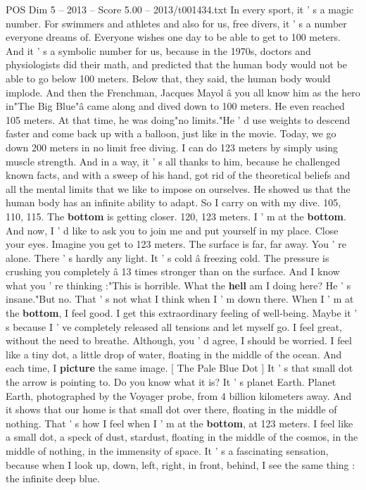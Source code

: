\begin{textsample}{POS Dim 5 – 2013 – Score 5.00 – 2013/t001434.txt}
In every sport, it ' s a magic number.
For swimmers and athletes and also for us, free divers, it ' s a number everyone dreams of.
Everyone wishes one day to be able to get to 100 meters.
And it ' s a symbolic number for us, because in the 1970s, doctors and physiologists did their math, and predicted that the human body would not be able to go below 100 meters.
Below that, they said, the human body would implode.
And then the Frenchman, Jacques Mayol â you all know him as the hero in"The Big Blue"â came along and dived down to 100 meters.
He even reached 105 meters.
At that time, he was doing"no limits."He ' d use weights to descend faster and come back up with a balloon, just like in the movie.
Today, we go down 200 meters in no limit free diving.
I can do 123 meters by simply using muscle strength.
And in a way, it ' s all thanks to him, because he challenged known facts, and with a sweep of his hand, got rid of the theoretical beliefs and all the mental limits that we like to impose on ourselves.
He showed us that the human body has an infinite ability to adapt.
So I carry on with my dive. 105, 110, 115.
The \textbf{bottom} is getting closer. 120, 123 meters.
I ' m at the \textbf{bottom}.
And now, I ' d like to ask you to join me and put yourself in my place.
Close your eyes.
Imagine you get to 123 meters.
The surface is far, far away.
You ' re alone.
There ' s hardly any light.
It ' s cold â freezing cold.
The pressure is crushing you completely â 13 times stronger than on the surface.
And I know what you ' re thinking :"This is horrible.
What the \textbf{hell} am I doing here?
He ' s insane."But no.
That ' s not what I think when I ' m down there.
When I ' m at the \textbf{bottom}, I feel good.
I get this extraordinary feeling of well-being.
Maybe it ' s because I ' ve completely released all tensions and let myself go.
I feel great, without the need to breathe.
Although, you ' d agree, I should be worried.
I feel like a tiny dot, a little drop of water, floating in the middle of the ocean.
And each time, I \textbf{picture} the same image. [ The Pale Blue Dot ] It ' s that small dot the arrow is pointing to.
Do you know what it is?
It ' s planet Earth.
Planet Earth, photographed by the Voyager probe, from 4 billion kilometers away.
And it shows that our home is that small dot over there, floating in the middle of nothing.
That ' s how I feel when I ' m at the \textbf{bottom}, at 123 meters.
I feel like a small dot, a speck of dust, stardust, floating in the middle of the cosmos, in the middle of nothing, in the immensity of space.
It ' s a fascinating sensation, because when I look up, down, left, right, in front, behind, I see the same thing : the infinite deep blue.

\end{textsample}
